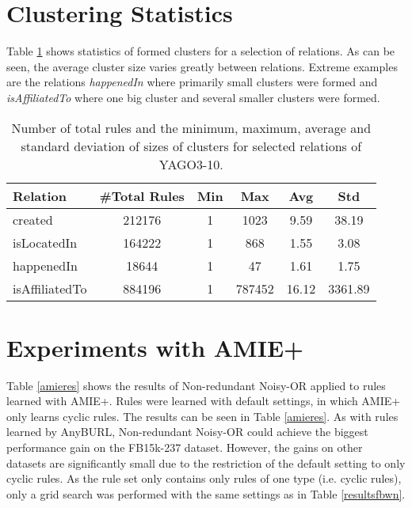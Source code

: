 \documentclass[akbc,twoside,11pt,lettersize]{article}
\begin{document}
\section{Clustering Statistics}

Table \ref{cluststat} shows statistics of formed clusters for a selection of relations. As can be seen, the average cluster size varies greatly between relations. Extreme examples are the relations \textit{happenedIn} where primarily small clusters were formed and \textit{isAffiliatedTo} where one big cluster and several smaller clusters were formed.

\begin{table}[h]
    \centering
    \begin{tabular}{lccccc}
        Relation & \#Total Rules & Min & Max & Avg & Std \\ \hline
        created & 212176 & 1 & 1023 & 9.59 & 38.19 \\
        isLocatedIn & 164222 & 1 & 868 & 1.55 & 3.08 \\
        happenedIn & 18644 & 1 & 47 & 1.61 & 1.75 \\
        isAffiliatedTo & 884196 & 1 & 787452 & 16.12 & 3361.89 \\

        \hline
    \end{tabular}
    \caption{ Number of total rules and the minimum, maximum, average and standard deviation of sizes of clusters for selected relations of YAGO3-10. }
    \label{cluststat}
\end{table}

\section{Experiments with AMIE+}
\label{appendix:amieres}

Table \ref{amieres} shows the results of Non-redundant Noisy-OR applied to rules learned with AMIE+. Rules were learned with default settings, in which AMIE+ only learns cyclic rules. The results can be seen in Table \ref{amieres}. As with rules learned by AnyBURL, Non-redundant Noisy-OR could achieve the biggest performance gain on the FB15k-237 dataset. However, the gains on other datasets are significantly small due to the restriction of the default setting to only cyclic rules. As the rule set only contains only rules of one type (i.e. cyclic rules), only a grid search was performed with the same settings as in Table \ref{resultsfbwn}.
\end{document}
